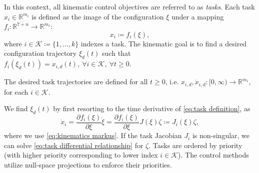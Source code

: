 \documentclass[../main.tex]{subfiles}
\begin{document}
In this context, all kinematic control objectives are referred to as \emph{tasks}. Each task \( x_i \in \mathbb
{R}^{m_i} \) is defined as the image of the configuration \( \xi \) under a mapping \( f_i: \mathbb{R}^{7+n} \to \mathbb{R}^{m_i} \):
\begin{equation}
\label{eq:task definition}
    x_i \coloneqq f_i(\xi),
\end{equation}
where \( i \in \mathcal{K} \coloneqq \{1, \dots, k\} \) indexes a task. The kinematic goal is to find a desired configuration trajectory \(\xi_d(t) \) such that \(f_i(\xi_d(t)) = x_{i,d}(t), \ \forall i \in \mathcal{K}, \ \forall t \geq 0\).
\begin{assumption}
    The desired task trajectories are defined for all \( t\geq0 \), i.e. \( x_{i,d}, \dot{x}_{i,d} : [0,\infty) \to \mathbb{R}^{m_i} \), for each \( i \in \mathcal{K} \). 
\end{assumption}
We find \( \xi_d(t) \) by first resorting to the time derivative of \eqref{eq:task definition}, as
\begin{equation}
\label{eq:task differential relationship}
    \dot{x}_i = \dfrac{\partial f_i(\xi)}{\partial \xi}\dot{\xi} = \dfrac{\partial f_i(\xi)}{\partial \xi} J (\xi) \zeta \coloneqq J_i (\xi) \zeta,
\end{equation}
where we use \eqref{eq:kinematics markus}. If the task Jacobian \( J_i \) is non-singular, we can solve \eqref{eq:task differential relationship} for \( \zeta \).
Tasks are ordered by priority (with higher priority corresponding to lower index \( i \in \mathcal{K} \)). The control methods utilize null-space projections to enforce their priorities. %
\end{document}
